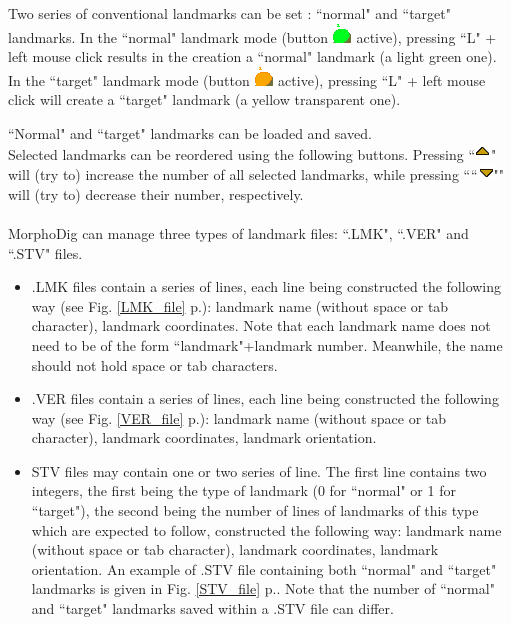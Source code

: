 Two series of conventional landmarks can be set : ``normal" and ``target" landmarks. In the ``normal" landmark mode (button \includegraphics[scale=0.7]{images/04/normal_landmarks.png} active), pressing ``L" + left mouse click results in the creation a ``normal" landmark (a light green one). In the ``target" landmark mode (button \includegraphics[scale=0.7]{images/04/target_landmarks.png} active),
pressing ``L" + left mouse click will create a ``target" landmark (a yellow transparent one).

 ``Normal" and ``target" landmarks can be loaded and saved.\\
Selected landmarks can be reordered using the following buttons. Pressing ``\includegraphics[scale=0.7]{images/06/objects/move_up.png}"
will (try to) increase the number of all selected landmarks, while pressing ````\includegraphics[scale=0.7]{images/06/objects/move_down.png}""
will (try to) decrease their number, respectively.\\\\
MorphoDig can manage three types of landmark files: ``.LMK", ``.VER" and ``.STV" files.
\begin{itemize}
\item 
 .LMK files contain a series of lines, each line
being constructed the following way (see Fig. \ref{LMK_file} p.\pageref{LMK_file}): landmark
name (without space or tab character),
landmark coordinates. Note that each landmark name does not need to be of the form ``landmark"+landmark number. Meanwhile, the name should not hold space or tab
characters.
\item .VER files contain a series
of lines, each line being
constructed the following
way (see Fig. \ref{VER_file} p.\pageref{VER_file}): landmark name (without space or tab character), landmark coordinates, landmark orientation.
\item STV files may contain one or two series of line. The first line contains two integers, the first being the type of landmark (0 for ``normal" or 1 for ``target"), the second being the number of lines of landmarks of this type which are expected to follow, constructed the following way: landmark name (without space or tab character), landmark coordinates, landmark orientation. An example of .STV file containing both ``normal" and ``target" landmarks is given in Fig. \ref{STV_file} p.\pageref{STV_file}. Note that the number of ``normal" and ``target" landmarks saved within a .STV file can differ.
\end{itemize}
